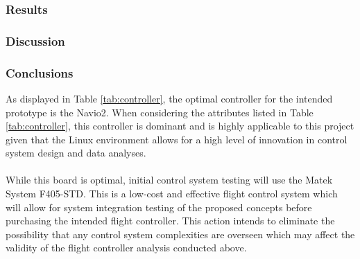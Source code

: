\subsubsection{Results}
\begin{table}[H]
\caption{Flight Controller Selection Matrix}
\label{controller}
\end{table}
\subsubsection{Discussion}
\subsubsection{Conclusions}
As displayed in Table \ref{tab:controller}, the optimal controller for the intended prototype is the Navio2. When considering the attributes listed in Table \ref{tab:controller}, this controller is dominant and is highly applicable to this project given that the Linux environment allows for a high level of innovation in control system design and data analyses.\\
\\
While this board is optimal, initial control system testing will use the Matek System F405-STD. This is a low-cost and effective flight control system which will allow for system integration testing of the proposed concepts before purchasing the intended flight controller. This action intends to eliminate the possibility that any control system complexities are overseen which may affect the validity of the flight controller analysis conducted above. 

